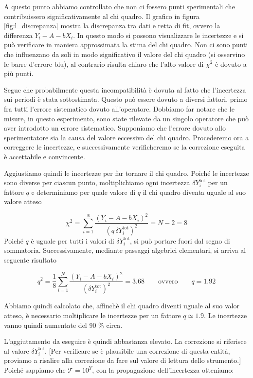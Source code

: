 A questo punto abbiamo controllato che non ci fossero punti sperimentali che contribuissero significativamente
al chi quadro. Il grafico in figura \ref{fig:l_discrepanza} mostra la discrepanza tra dati e retta di fit,
ovvero la differenza $Y_i - A - bX_i$. In questo modo si possono visualizzare le incertezze e si può verificare
in maniera approssimata la stima del chi quadro. Non ci sono punti che influenzano da soli in modo significativo
il valore del chi quadro (si osservino le barre d'errore blu), al contrario risulta chiaro che l'alto valore di $\chi^2$
è dovuto a più punti.

Segue che probabilmente questa incompatibilità è dovuta al fatto che l'incertezza sui periodi è stata sottostimata.
Questo può essere dovuto a diversi fattori, primo fra tutti l'errore sistematico dovuto all'operatore. Dobbiamo
far notare che le misure, in questo esperimento, sono state rilevate da un singolo operatore che può aver introdotto
un errore sistematico. Supponiamo che
l'errore dovuto allo sperimentatore sia la causa del valore eccessivo del chi quadro. Procederemo ora a correggere le incertezze,
e successivamente verificheremo se la correzione eseguita è accettabile e convincente.

Aggiustiamo quindi le incertezze per far tornare il chi quadro.  Poiché le incertezze sono diverse per ciascun punto,
moltiplichiamo ogni incertezza $\delta Y_i^{\text{tot}}$ per un fattore $q$ e determiniamo per quale valore di $q$
il chi quadro diventa uguale al suo valore atteso

\begin{equation}
    \chi^2 = \sum_{i=1}^N \frac{(Y_i - A - bX_i)^2}{(q\, \delta Y_i^{\text{tot}})^2} = N - 2 = 8
\end{equation}
%
Poiché $q$ è uguale per tutti i valori di $\delta Y_i^{\text{tot}}$, si può portare fuori dal segno di sommatoria.
Successivamente, mediante passaggi algebrici elementari, si arriva al seguente risultato

\begin{equation}
    q^2 = \frac{1}{8} \sum_{i=1}^N \frac{(Y_i - A - bX_i)^2}{(\delta Y_i^{\text{tot}})^2} = 3.68 \qquad \text{ovvero} \qquad q = 1.92
\end{equation}

Abbiamo quindi calcolato che, affinchè il chi quadro diventi uguale al suo valor atteso, è necessario moltiplicare
le incertezze per un fattore $q \simeq 1.9$. Le incertezze vanno quindi aumentate del 90 \% circa.

L'aggiutamento da eseguire è quindi abbastanza elevato. La correzione si riferisce al valore $\delta Y_i^{\text{tot}}$.
[Per verificare se è plausibile una correzione di questa entità, proviamo a risalire alla correzione da fare sul valore di lettura
dello strumento.]
Poiché sappiamo che $\mathcal{T} = 10^Y$, con la propagazione dell'incertezza otteniamo:

